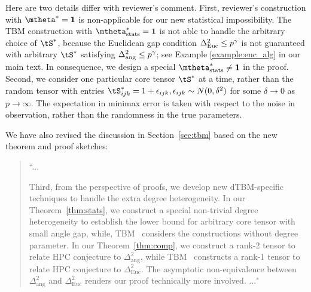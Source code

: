 \documentclass[11pt]{article}
\theoremstyle{definition}
\theoremstyle{definition}
\begin{document}
\begin{enumerate}
\begin{enumerate}[wide]
    Here are two details differ with reviewer's comment. First, reviewer's construction with $\mtheta^* = \mathbf{1}$ is non-applicable for our new statistical impossibility. The TBM construction with $\mtheta^*_{\rm stats} = \mathbf{1}$ is not able to handle the arbitrary choice of $\tS^*$, because the Euclidean gap condition $\Delta_{\rm Euc}^2 \leq p^{\gamma}$ is not guaranteed with arbitrary $\tS^*$ satisfying $\Delta_{\rm ang}^2 \leq p^{\gamma}$; see Example \ref{example:euc_alg} in our main text. In consequence, we design a special $\mtheta^*_{\rm stats} \neq \mathbf{1}$ in the proof.
    Second, we consider one particular core tensor $\tS^*$ at a time, rather than the random tensor with entries $\tS_{ijk}^* = 1 + \epsilon_{ijk}, \epsilon_{ijk} \sim N(0, \delta^2)$ for some $\delta \rightarrow 0$ as $p \rightarrow \infty$. The expectation in minimax error is taken with respect to the noise in observation, rather than the randomness in the true parameters. 
    
    We have also revised the discussion in Section~\ref{sec:tbm} based on the new theorem and proof sketches:
    
    \begin{quote}
    ``...
    
    Third, from the perspective of proofs, we develop new dTBM-specific techniques to handle the extra degree heterogeneity. In our Theorem~\ref{thm:stats}, we construct a special non-trivial degree heterogeneity to establish the lower bound for arbitrary core tensor with small angle gap, while, TBM~\citep{han2020exact} considers the constructions without degree parameter.
In our Theorem~\ref{thm:comp}, we construct a rank-2 tensor to relate HPC conjecture to $\Delta^2_{\text{ang}}$, while TBM~\citep{han2020exact} constructs a rank-1 tensor to relate HPC conjecture to $\Delta^2_{\text{Euc}}$. The asymptotic non-equivalence between $\Delta^2_{\text{ang}}$ and $\Delta^2_{\text{Euc}}$ renders our proof technically more involved. ..."
    \end{quote}
    

\end{enumerate}
\end{enumerate}
\end{document}
